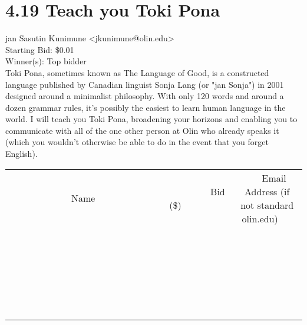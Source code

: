 \documentclass[11pt]{article}
\begin{document}
					\section*{4.19 Teach you Toki Pona}
					jan Sasutin Kunimune <jkunimune@olin.edu> \\
					Starting Bid: \$0.01 \\
					Winner(s): Top bidder \\
					Toki Pona, sometimes known as The Language of Good, is a constructed language published by Canadian linguist Sonja Lang (or "jan Sonja") in 2001 designed around a minimalist philosophy. With only 120 words and around a dozen grammar rules, it's possibly the easiest to learn human language in the world. I will teach you Toki Pona, broadening your horizons and enabling you to communicate with all of the one other person at Olin who already speaks it (which you wouldn't otherwise be able to do in the event that you forget English). \\
					[6ex]
					\begin{tabular}{c c c}
						~~~~~~~~~~~~~Name~~~~~~~~~~~~~ & ~~~~~~~~~Bid (\$)~~~~~~~~~ & ~~~Email Address (if not standard olin.edu)~~~ \\
				
 & & \\
\hline
 & & \\
\hline
 & & \\
\hline
 & & \\
\hline
 & & \\
\hline
 & & \\
\hline
 & & \\
\hline
 & & \\
\hline
 & & \\
\hline
 & & \\
\hline
 & & \\
\hline
 & & \\
\hline
 & & \\
\hline
 & & \\
\hline
 & & \\
\hline
 & & \\
\hline
 & & \\
\hline
 & & \\
\hline
 & & \\
\hline
 & & \\
\hline
 & & \\
\hline
 & & \\
\hline
 & & \\
\hline
 & & \\
\hline
 & & \\
\hline
 & & \\
\hline
					\end{tabular}
					\clearpage
				
\end{document}
